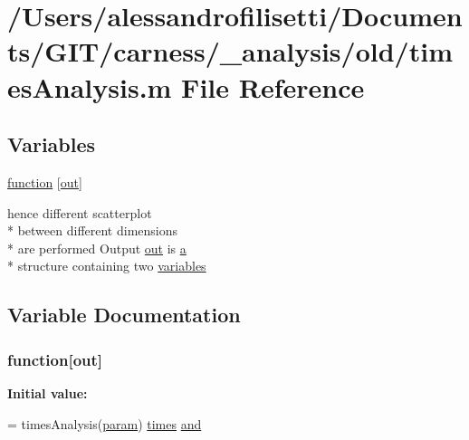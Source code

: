 \hypertarget{a00037}{\section{/\-Users/alessandrofilisetti/\-Documents/\-G\-I\-T/carness/\-\_\-analysis/old/times\-Analysis.m File Reference}
\label{a00037}
}
\subsection*{Variables}
\begin{DoxyCompactItemize}
\item 
\hyperlink{a00037_a370f3dd25136a73d619eba0aa2e3bb4b}{function} \mbox{[}\hyperlink{a00028_a34c820385e9209f49c18739329ad9206}{out}\mbox{]}
\item 
hence different scatterplot \\*
between different dimensions \\*
are performed Output \hyperlink{a00028_a34c820385e9209f49c18739329ad9206}{out} is \hyperlink{a00035_a2ffdbad9ea59541e59cbd2b938e0770c}{a} \\*
structure containing two \hyperlink{a00037_a075795b83d470ba58980e465541f16e9}{variables}
\end{DoxyCompactItemize}


\subsection{Variable Documentation}
\hypertarget{a00037_a370f3dd25136a73d619eba0aa2e3bb4b}{
\subsubsection[{function}]{\setlength{\rightskip}{0pt plus 5cm}function\mbox{[}{\bf out}\mbox{]}}}\label{a00037_a370f3dd25136a73d619eba0aa2e3bb4b}
{\bfseries Initial value\-:}
\begin{DoxyCode}
= timesAnalysis(\hyperlink{a00028_a51f20d6b1b54a2eee3be0e8adc96a0ae}{param})
%
      \hyperlink{a00028_a47868b053902b822eab5c738a67a633a}{times} \hyperlink{a00028_a170f8acb213f91bf71c77b1d20bceb33}{and}
\end{DoxyCode}


